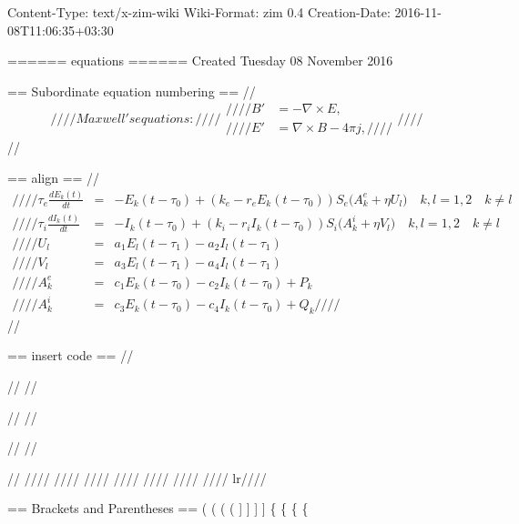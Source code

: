 Content-Type: text/x-zim-wiki
Wiki-Format: zim 0.4
Creation-Date: 2016-11-08T11:06:35+03:30

====== equations ======
Created Tuesday 08 November 2016

== Subordinate equation numbering ==
//\begin{subequations}//
//Maxwell's equations://
//\begin{align}//
//        B'&=-\nabla \times E,\\//
//        E'&=\nabla \times B - 4\pi j,//
//\end{align}//
//\end{subequations}//

== align ==
//\begin{eqnarray*}//
//\tau_e \frac{dE_k(t)}{dt}&= &-E_k(t-\tau_0) +(k_e-r_e E_k(t-\tau_0))S_e\big(A_k^e +\eta U_l\big) \quad k,l =1,2 \quad k\neq l \\//
//\tau_i \frac{dI_k(t)}{dt}&= &-I_k(t-\tau_0) +(k_i-r_i I_k(t-\tau_0))S_i\big(A_k^i +\eta V_l\big) \quad k,l =1,2 \quad k\neq l     \\//
//U_l   &=  &a_1 E_l(t-\tau_1) - a_2 I_l(t-\tau_1) \\//
//V_l   &=  &a_3 E_l(t-\tau_1) -a_4 I_l(t-\tau_1)  \\//
//A_k^e &=  &c_1E_k(t-\tau_0) -c_2I_k(t-\tau_0) +P_k  \\//
//A_k^i &=  &c_3E_k(t-\tau_0) -c_4I_k(t-\tau_0) +Q_k    //
//\end{eqnarray*}//

== insert code ==
//\usepackage{listings}//
//\usepackage{listings}//
//\usepackage{float}//
//\usepackage{color}//
////
////
////
////
////
////
////
lr{//}//

== Brackets and Parentheses ==
\big( \Big( \bigg( \Bigg( 	
\big] \Big] \bigg] \Bigg] 
\big\{ \Big\{ \bigg\{ \Bigg\{ 



